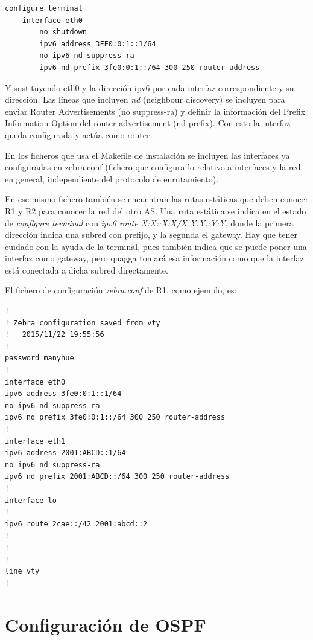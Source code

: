 \documentclass{article}
\begin{document}
\hfil

\begin{BVerbatim}
configure terminal
	interface eth0
		no shutdown
		ipv6 address 3FE0:0:1::1/64
		no ipv6 nd suppress-ra
		ipv6 nd prefix 3fe0:0:1::/64 300 250 router-address
\end{BVerbatim}

\hfil

Y sustituyendo eth0 y la dirección ipv6 por cada interfaz correspondiente y su dirección. Las líneas que incluyen \textit{nd} (neighbour discovery) se incluyen para enviar Router Advertisements (no suppress-ra) y definir la información del Prefix Information Option del router advertisement (nd prefix). Con esto la interfaz queda configurada y actúa como router.


En los ficheros que usa el Makefile de instalación se incluyen las interfaces ya configuradas en zebra.conf (fichero que configura lo relativo a interfaces y la red en general, independiente del protocolo de enrutamiento).

En ese mismo fichero también se encuentran las rutas estáticas que deben conocer R1 y R2 para conocer la red del otro AS. Una ruta estática se indica en el estado de \textit{configure terminal} con \textit{ipv6 route X:X::X:X/X  Y:Y::Y:Y}, donde la primera dirección indica una subred con prefijo, y la segunda el gateway. Hay que tener cuidado con la ayuda de la terminal, pues también indica que se puede poner una interfaz como gateway, pero quagga tomará esa información como que la interfaz está conectada a dicha subred directamente.

\hfil

El fichero de configuración \textit{zebra.conf} de R1, como ejemplo, es:

\begin{lstlisting}
!
! Zebra configuration saved from vty
!   2015/11/22 19:55:56
!
password manyhue
!
interface eth0
ipv6 address 3fe0:0:1::1/64
no ipv6 nd suppress-ra
ipv6 nd prefix 3fe0:0:1::/64 300 250 router-address
!
interface eth1
ipv6 address 2001:ABCD::1/64
no ipv6 nd suppress-ra
ipv6 nd prefix 2001:ABCD::/64 300 250 router-address
!
interface lo
!
ipv6 route 2cae::/42 2001:abcd::2
!
!
!
line vty
!
\end{lstlisting}


\section{Configuración de OSPF}
\end{document}
